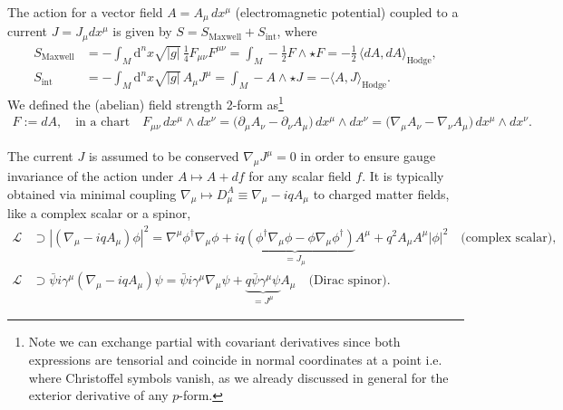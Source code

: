 \documentclass[../geometry_main.tex]{subfiles}
\begin{document}
\begin{mytheorem}
%
The action for a vector field $A=A_\mu \,dx^\mu$ (electromagnetic potential) coupled to a current $J=J_\mu d x^\mu$ is given by $S=S_{\mathrm{Maxwell}}+S_{\mathrm{int}}$, where
\begin{align}
    S_{\mathrm{Maxwell}}&= -\int_M \!\!\mathrm{d}^n x \sqrt{|g|}\, \tfrac{1}{4} F_{\mu\nu} F^{\mu\nu} 
    = \int_M\!\! -\tfrac{1}{2} F \wedge \star F  = -\tfrac{1}{2}\,\langle dA, dA\rangle_{\mathrm{Hodge}},
    \\
    S_{\mathrm{int}}&= -\int_M \!\!\mathrm{d}^n x \sqrt{|g|}\, A_\mu J^\mu = \int_M -A \wedge \star J = -\langle A, J \rangle_{\mathrm{Hodge}}.
\end{align}
We defined the (abelian) field strength 2-form as\footnote{\label{fn:covariant_vs_partial_dif_forms}Note we can exchange partial with covariant derivatives since both expressions are tensorial and coincide in normal coordinates at a point i.e. where Christoffel symbols vanish, as we already discussed in general for the exterior derivative of any $p$-form.}
\begin{align}
    F:=dA, \quad \text{in a chart}\quad F_{\mu\nu} \,dx^\mu\wedge dx^\nu = \Big(\partial_\mu A_\nu - \partial_\nu A_\mu\Big)\, dx^\mu\wedge dx^\nu =\Big(\nabla_\mu A_\nu - \nabla_\nu A_\mu\Big)\, dx^\mu\wedge dx^\nu.
\end{align}
%

The current $J$ is assumed to be conserved $\nabla_\mu J^\mu=0$ in order to ensure gauge invariance of the action under $A\mapsto A + d f$ for any scalar field $f$.
%
It is typically obtained via minimal coupling $\nabla_\mu \mapsto D_\mu^A\equiv\nabla_\mu - i q A_\mu$ to charged matter fields, like a complex scalar or a spinor,
\begin{align}
    \mathcal{L}&\supset |(\nabla_\mu - i q A_\mu)\phi|^2 = \nabla^\mu\phi^\dagger \nabla_\mu \phi + \underbrace{i q (\phi^\dagger \nabla_\mu \phi - \phi \nabla_\mu \phi^\dagger)}_{=J_\mu}A^\mu + q^2 A_\mu A^\mu |\phi|^2 \quad \text{(complex scalar),}
    \\[7pt]
    \mathcal{L}&\supset \bar{\psi} i \gamma^\mu (\nabla_\mu - i q A_\mu)\psi = \bar{\psi} i \gamma^\mu \nabla_\mu \psi +  \underbrace{q\bar{\psi} \gamma^\mu \psi}_{=J^\mu} A_\mu \quad \text{(Dirac spinor).}
\end{align}


\end{mytheorem}
\end{document}
